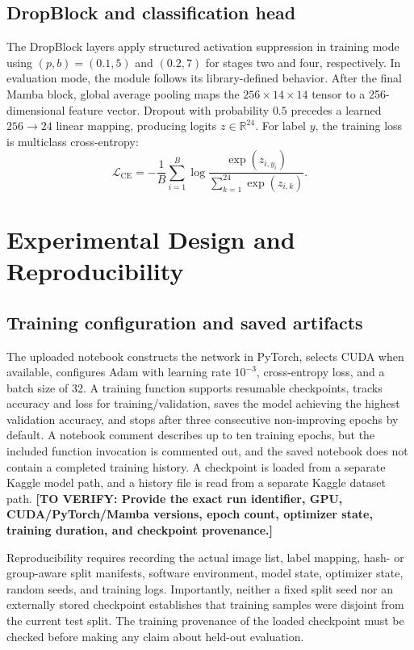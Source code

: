 \documentclass[11pt,a4paper]{article}
\newcommand{\todo}[1]{\textcolor{red!70!black}{\textbf{[TO VERIFY: #1]}}}
\begin{document}
\subsection{DropBlock and classification head}
The DropBlock layers apply structured activation suppression in training mode using $(p,b)=(0.1,5)$ and $(0.2,7)$ for stages two and four, respectively. In evaluation mode, the module follows its library-defined behavior. After the final Mamba block, global average pooling maps the $256\times14\times14$ tensor to a 256-dimensional feature vector. Dropout with probability $0.5$ precedes a learned $256\to24$ linear mapping, producing logits $z\in\mathbb{R}^{24}$. For label $y$, the training loss is multiclass cross-entropy:
\begin{equation}
 \mathcal{L}_{\mathrm{CE}} = -\frac{1}{B}\sum_{i=1}^{B}\log\frac{\exp(z_{i,y_i})}{\sum_{k=1}^{24}\exp(z_{i,k})}.
\end{equation}

\section{Experimental Design and Reproducibility}\label{sec:experiments}
\subsection{Training configuration and saved artifacts}
The uploaded notebook constructs the network in PyTorch, selects CUDA when available, configures Adam with learning rate $10^{-3}$, cross-entropy loss, and a batch size of 32. A training function supports resumable checkpoints, tracks accuracy and loss for training/validation, saves the model achieving the highest validation accuracy, and stops after three consecutive non-improving epochs by default. A notebook comment describes up to ten training epochs, but the included function invocation is commented out, and the saved notebook does not contain a completed training history. A checkpoint is loaded from a separate Kaggle model path, and a history file is read from a separate Kaggle dataset path. \todo{Provide the exact run identifier, GPU, CUDA/PyTorch/Mamba versions, epoch count, optimizer state, training duration, and checkpoint provenance.}

Reproducibility requires recording the actual image list, label mapping, hash- or group-aware split manifests, software environment, model state, optimizer state, random seeds, and training logs. Importantly, neither a fixed split seed nor an externally stored checkpoint establishes that training samples were disjoint from the current test split. The training provenance of the loaded checkpoint must be checked before making any claim about held-out evaluation.
\end{document}
